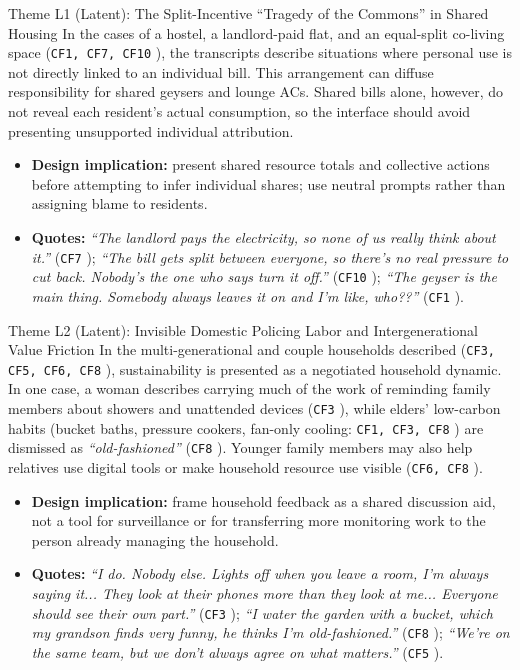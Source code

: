 \documentclass[12pt, a4paper]{article}
\begin{document}
\begin{latentcard}{Theme L1 (Latent): The Split-Incentive ``Tragedy of the Commons'' in Shared Housing}
In the cases of a hostel, a landlord-paid flat, and an equal-split co-living space (\texttt{CF1, CF7, CF10} \cite{cf1, cf7, cf10, froehlich2012, tiefenbeck2019}), the transcripts describe situations where personal use is not directly linked to an individual bill. This arrangement can diffuse responsibility for shared geysers and lounge ACs. Shared bills alone, however, do not reveal each resident's actual consumption, so the interface should avoid presenting unsupported individual attribution.
\begin{itemize}
    \item \textbf{Design implication:} present shared resource totals and collective actions before attempting to infer individual shares; use neutral prompts rather than assigning blame to residents.
    \item \textbf{Quotes:} \textit{``The landlord pays the electricity, so none of us really think about it.''} (\texttt{CF7} \cite{cf7}); \textit{``The bill gets split between everyone, so there's no real pressure to cut back. Nobody's the one who says turn it off.''} (\texttt{CF10} \cite{cf10}); \textit{``The geyser is the main thing. Somebody always leaves it on and I'm like, who??''} (\texttt{CF1} \cite{cf1}).
\end{itemize}
\end{latentcard}

\begin{latentcard}{Theme L2 (Latent): Invisible Domestic Policing Labor and Intergenerational Value Friction}
In the multi-generational and couple households described (\texttt{CF3, CF5, CF6, CF8} \cite{cf3, cf5, cf6, cf8}), sustainability is presented as a negotiated household dynamic. In one case, a woman describes carrying much of the work of reminding family members about showers and unattended devices (\texttt{CF3} \cite{cf3}), while elders' low-carbon habits (bucket baths, pressure cookers, fan-only cooling: \texttt{CF1, CF3, CF8} \cite{cf1, cf3, cf8}) are dismissed as \textit{``old-fashioned''} (\texttt{CF8} \cite{cf8}). Younger family members may also help relatives use digital tools or make household resource use visible (\texttt{CF6, CF8} \cite{cf6, cf8}).
\begin{itemize}
    \item \textbf{Design implication:} frame household feedback as a shared discussion aid, not a tool for surveillance or for transferring more monitoring work to the person already managing the household.
    \item \textbf{Quotes:} \textit{``I do. Nobody else. Lights off when you leave a room, I'm always saying it... They look at their phones more than they look at me... Everyone should see their own part.''} (\texttt{CF3} \cite{cf3}); \textit{``I water the garden with a bucket, which my grandson finds very funny, he thinks I'm old-fashioned.''} (\texttt{CF8} \cite{cf8}); \textit{``We're on the same team, but we don't always agree on what matters.''} (\texttt{CF5} \cite{cf5}).
\end{itemize}
\end{latentcard}
\end{document}
